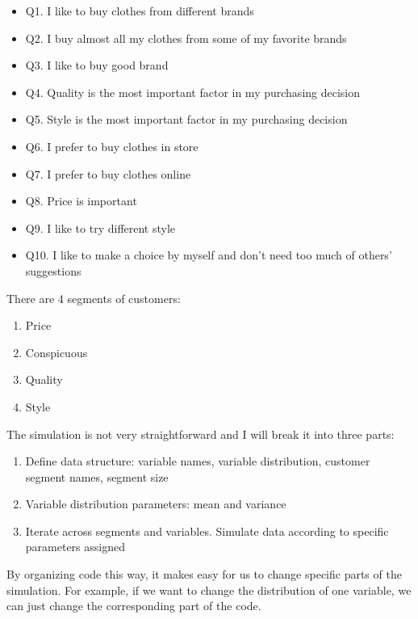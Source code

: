 \documentclass[
]{article}
\providecommand{\tightlist}{%
  \setlength{\itemsep}{0pt}\setlength{\parskip}{0pt}}
\begin{document}
\begin{itemize}
\tightlist
\item
  Q1. I like to buy clothes from different brands
\item
  Q2. I buy almost all my clothes from some of my favorite brands
\item
  Q3. I like to buy good brand
\item
  Q4. Quality is the most important factor in my purchasing decision
\item
  Q5. Style is the most important factor in my purchasing decision
\item
  Q6. I prefer to buy clothes in store
\item
  Q7. I prefer to buy clothes online
\item
  Q8. Price is important
\item
  Q9. I like to try different style
\item
  Q10. I like to make a choice by myself and don't need too much of
  others' suggestions
\end{itemize}

There are 4 segments of customers:

\begin{enumerate}
\def\labelenumi{\arabic{enumi}.}
\tightlist
\item
  Price
\item
  Conspicuous
\item
  Quality
\item
  Style
\end{enumerate}

The simulation is not very straightforward and I will break it into
three parts:

\begin{enumerate}
\def\labelenumi{\arabic{enumi}.}
\tightlist
\item
  Define data structure: variable names, variable distribution, customer
  segment names, segment size
\item
  Variable distribution parameters: mean and variance
\item
  Iterate across segments and variables. Simulate data according to
  specific parameters assigned
\end{enumerate}

By organizing code this way, it makes easy for us to change specific
parts of the simulation. For example, if we want to change the
distribution of one variable, we can just change the corresponding part
of the code.
\end{document}
